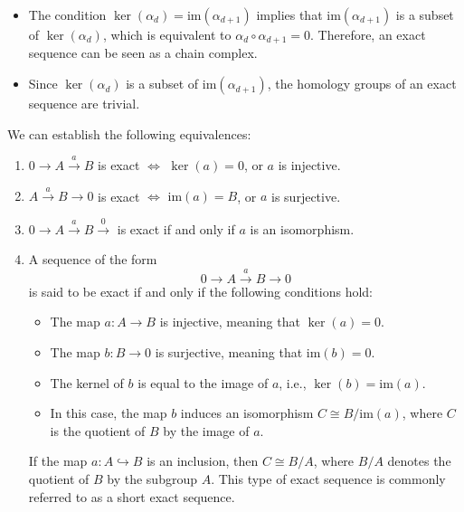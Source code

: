 \begin{remark}
\begin{itemize}
\item The condition \( \ker(\alpha_{d}) = \mathrm{im}(\alpha_{d+1}) \) implies that \( \mathrm{im}(\alpha_{d+1}) \) is a subset of \( \ker(\alpha_{d}) \), which is equivalent to \( \alpha_{d} \circ \alpha_{d+1} = 0 \). Therefore, an exact sequence can be seen as a chain complex.

\item Since \( \ker(\alpha_{d}) \) is a subset of \( \mathrm{im}(\alpha_{d+1}) \), the homology groups of an exact sequence are trivial.
\end{itemize}
\end{remark}

\begin{proposition}{\cite[\S 1.3.1]{Weibel1994}}
	We can establish the following equivalences:
	\begin{enumerate}
		\item $0 \xrightarrow{}A \xrightarrow{a}B$ is exact $\Longleftrightarrow$ $\ker
			(a) = 0$, or $a$ is injective.

		\item $A \xrightarrow{a}B \rightarrow 0$ is exact $\Longleftrightarrow$ $\mathrm{im}
			(a) = B$, or $a$ is surjective.

		\item $0 \xrightarrow{}A \xrightarrow{a}B \xrightarrow 0$ is exact if and only
			if $a$ is an isomorphism.

		\item A sequence of the form
			\begin{equation}
				0 \xrightarrow{}A \xrightarrow{a}B \xrightarrow{}0
			\end{equation}
			is said to be exact if and only if the following conditions hold:
			\begin{itemize}
				\item The map $a: A \rightarrow B$ is injective, meaning that
					$\ker(a) = 0$.

				\item The map $b: B \rightarrow 0$ is surjective, meaning that
					$\mathrm{im}(b) = 0$.

				\item The kernel of $b$ is equal to the image of $a$, i.e.,
					$\ker(b) = \mathrm{im}(a)$.

				\item In this case, the map $b$ induces an isomorphism
					$C \cong B/\mathrm{im}(a)$, where $C$ is the quotient of $B$ by the image
					of $a$.
			\end{itemize}
			If the map $a: A \hookrightarrow B$ is an inclusion, then $C \cong B/A$,
			where $B/A$ denotes the quotient of $B$ by the subgroup $A$. This type of exact
			sequence is commonly referred to as a short exact sequence.
	\end{enumerate}
\end{proposition}


